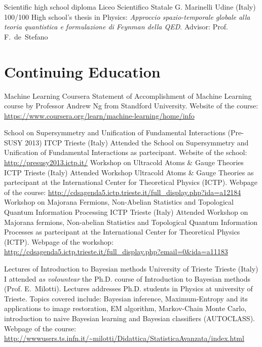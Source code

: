 \documentclass[10pt,a4paper]{moderncv}   %
\begin{document}
{Scientific high school diploma} 
{Liceo Scientifico Statale G. Marinelli}
{Udine (Italy)}
{100/100}
{High school's thesis in Physics: \emph{Approccio spazio-temporale globale alla
      teoria quantistica e formulazione di Feynman della QED}. Advisor: Prof.
   F.~de~Stefano}
 

\section{Continuing Education}


{Machine Learning}
{Coursera}
{}
{}
{Statement of Accomplishment of Machine Learning course by Professor Andrew Ng
   from Standford University.
   Website of the course:
   \url{ https://www.coursera.org/learn/machine-learning/home/info}}


{School on Supersymmetry and Unification of Fundamental Interactions (Pre-SUSY
   2013)}
{ITCP}
{Trieste (Italy)}
{}
{Attended the School on Supersymmetry and Unification of
   Fundamental Interactions as partecipant. Website of the school:
   \url{http://presusy2013.ictp.it/}}
{Workshop on Ultracold Atoms \& Gauge
   Theories}
{ICTP}
{Trieste (Italy)}{}
{Attended Workshop Ultracold Atoms \& Gauge Theories as
   partecipant at the International Center for Theoretical Physics (ICTP).
   Webpage of the course:
   \url{http://cdsagenda5.ictp.trieste.it/full_display.php?ida=a12184}}
{Workshop on Majorana Fermions, Non-Abelian Statistics and Topological Quantum Information Processing}%
{ICTP}
{Trieste (Italy)}
{}
{Attended Workshop on Majorana fermions, Non-abelian Statistics and Topological
   Quantum Information Processes as
   partecipant at the International Center for Theoretical Physics (ICTP).
   Webpage of the workshop:
   \url{http://cdsagenda5.ictp.trieste.it/full_display.php?email=0&ida=a11183}}

%
{Lectures of Introduction to Bayesian methods}
{University of Trieste}
{Trieste (Italy)}{}
{I attended \emph{as volountear} the Ph.D. course of Introduction to Bayesian methods (Prof.
   E.~Milotti).
   Lectures addresses Ph.D. students in Physics at university of Trieste.
Topics covered include: Bayesian inference, Maximum-Entropy and its applications
to image restoration, EM algorithm, Markov-Chain Monte Carlo, introduction to
naive Bayesian learning and 
Bayesian classifiers (AUTOCLASS). 
Webpage of the course:
\url{http://wwwusers.ts.infn.it/~milotti/Didattica/StatisticaAvanzata/index.html}}
\end{document}
